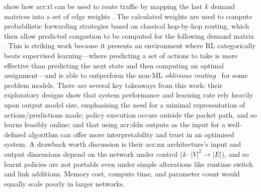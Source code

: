 \textcite{DBLP:conf/hotnets/ValadarskySST17} show how \gls{acr:rl} can be used to route traffic by mapping the last $k$ demand matrices \prllitstate{} into a set of edge weights \prllitactreal.
The calculated weights are used to compute probabilistic forwarding strategies based on classical hop-by-hop routing, which then allow predicted congestion to be computed for the following demand matrix \prllitreward.
This is striking work because it presents an environment where RL categorically beats supervised learning---where predicting a set of actions to take is more effective than predicting the next state and then computing an optimal assignment---and is able to outperform the non-ML \emph{oblivious routing}~\parencite{DBLP:conf/stoc/AzarCFKR03} for some problem models.
There are several key takeaways from this work: their exploratory designs show that system performance and learning rate rely heavily upon output model size, emphasising the need for a minimal representation of actions/predictions made; policy execution occurs outside the packet path, and so learns feasibly online; and that using \gls{acr:ddn} outputs as the input for a well-defined algorithm can offer more interpretability and trust in an optimised system.
A drawback worth discussion is their \gls{acr:nn} architecture's input and output dimensions depend on the network under control ($k\cdot\left|V\right|^2\rightarrow\left|E\right|$), and so learnt policies are not portable even under simple alterations like runtime switch and link additions.
Memory cost, compute time, and parameter count would equally scale poorly in larger networks.

